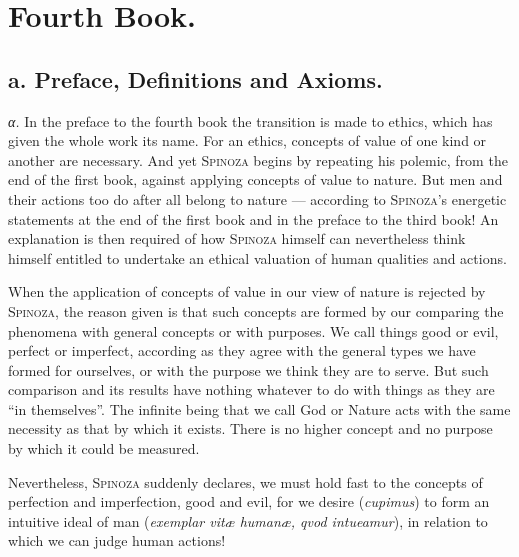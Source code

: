 \documentclass[12pt]{article}
\newcommand{\opage}[1]{\marginnote{\footnotesize\textit{[#1]}}}
\begin{document}
\opage{70}\section*{Fourth Book.}
\subsection*{a. Preface, Definitions and Axioms.}

\textit{α.} In the preface to the fourth book the transition is made to ethics, which has given
the whole work its name. For an ethics, concepts of value of one kind or another are necessary. And
yet \textsc{Spinoza} begins by repeating his polemic, from the end of the first book, against
applying concepts of value to nature. But men and their actions too do after all belong to nature
--- according to \textsc{Spinoza}'s energetic statements at the end of the first book and in the
preface to the third book! An explanation is then required of how \textsc{Spinoza} himself can
nevertheless think himself entitled to undertake an ethical valuation of human qualities and
actions.

When the application of concepts of value in our view of nature is rejected by \textsc{Spinoza},
the reason given is that such concepts are formed by our comparing the phenomena with general
concepts or with purposes. We call things good or evil, perfect or imperfect, according as they
agree with the general types we have formed for ourselves, or with the purpose we think they are to
serve. But such comparison and its results have nothing whatever to do with things as they are
``in themselves''. The infinite being that we call God or Nature acts with the same necessity as
that by which it exists. There is no higher concept and no purpose by which it could be measured.

Nevertheless, \textsc{Spinoza} suddenly declares, we must hold fast to the concepts of perfection
and imperfection, good and evil, for we desire (\textit{cupimus}) to form an intuitive ideal of man
(\textit{exemplar vitæ humanæ, qvod intueamur}), in relation to which we can judge human actions!
\end{document}
